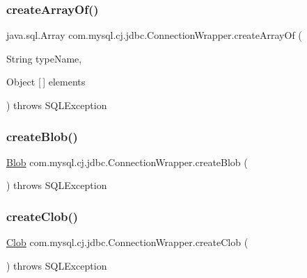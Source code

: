 \subsubsection{\texorpdfstring{create\+Array\+Of()}{createArrayOf()}}
{\footnotesize\ttfamily java.\+sql.\+Array com.\+mysql.\+cj.\+jdbc.\+Connection\+Wrapper.\+create\+Array\+Of (\begin{DoxyParamCaption}\item[{String}]{type\+Name,  }\item[{Object \mbox{[}$\,$\mbox{]}}]{elements }\end{DoxyParamCaption}) throws S\+Q\+L\+Exception}

\mbox{\label{classcom_1_1mysql_1_1cj_1_1jdbc_1_1_connection_wrapper_a305257c648e7625e6b25af2812d3af2f}} 
\subsubsection{\texorpdfstring{create\+Blob()}{createBlob()}}
{\footnotesize\ttfamily \mbox{\hyperlink{classcom_1_1mysql_1_1cj_1_1jdbc_1_1_blob}{Blob}} com.\+mysql.\+cj.\+jdbc.\+Connection\+Wrapper.\+create\+Blob (\begin{DoxyParamCaption}{ }\end{DoxyParamCaption}) throws S\+Q\+L\+Exception}

\mbox{\label{classcom_1_1mysql_1_1cj_1_1jdbc_1_1_connection_wrapper_a63e2f80582dd181cf909a8d9a6bb4822}} 
\subsubsection{\texorpdfstring{create\+Clob()}{createClob()}}
{\footnotesize\ttfamily \mbox{\hyperlink{classcom_1_1mysql_1_1cj_1_1jdbc_1_1_clob}{Clob}} com.\+mysql.\+cj.\+jdbc.\+Connection\+Wrapper.\+create\+Clob (\begin{DoxyParamCaption}{ }\end{DoxyParamCaption}) throws S\+Q\+L\+Exception}

